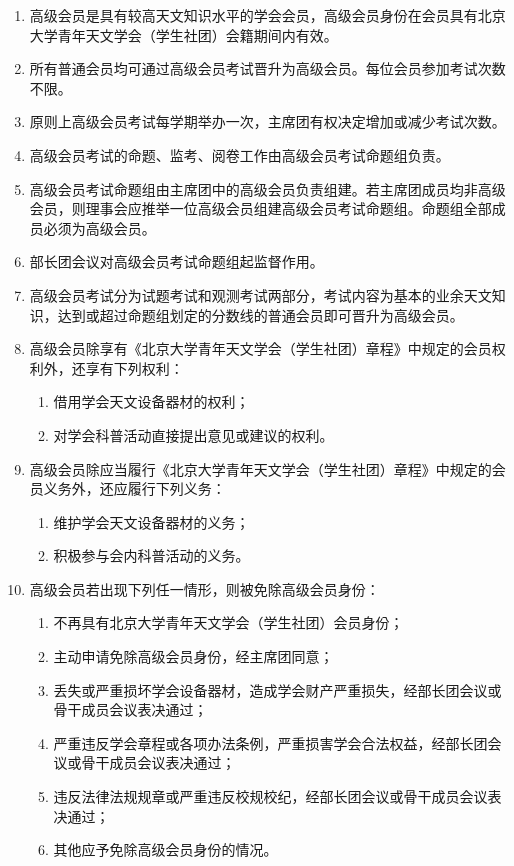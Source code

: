 \begin{enumerate}[resume]
    \item 高级会员是具有较高天文知识水平的学会会员，高级会员身份在会员具有北京大学青年天文学会（学生社团）会籍期间内有效。
    
    \item 所有普通会员均可通过高级会员考试晋升为高级会员。每位会员参加考试次数不限。
    
    \item 原则上高级会员考试每学期举办一次，主席团有权决定增加或减少考试次数。
    
    \item 高级会员考试的命题、监考、阅卷工作由高级会员考试命题组负责。
    
    \item 高级会员考试命题组由主席团中的高级会员负责组建。若主席团成员均非高级会员，则理事会应推举一位高级会员组建高级会员考试命题组。命题组全部成员必须为高级会员。
    
    \item 部长团会议对高级会员考试命题组起监督作用。
    
    \item 高级会员考试分为试题考试和观测考试两部分，考试内容为基本的业余天文知识，达到或超过命题组划定的分数线的普通会员即可晋升为高级会员。
    
    \item 高级会员除享有《北京大学青年天文学会（学生社团）章程》中规定的会员权利外，还享有下列权利：
    \begin{enumerate}
        \item 借用学会天文设备器材的权利；
        \item 对学会科普活动直接提出意见或建议的权利。
    \end{enumerate}

    \item 高级会员除应当履行《北京大学青年天文学会（学生社团）章程》中规定的会员义务外，还应履行下列义务：
    \begin{enumerate}
        \item 维护学会天文设备器材的义务；
        \item 积极参与会内科普活动的义务。
    \end{enumerate}

    \item 高级会员若出现下列任一情形，则被免除高级会员身份：
    \begin{enumerate}
        \item 不再具有北京大学青年天文学会（学生社团）会员身份；
        \item 主动申请免除高级会员身份，经主席团同意；
        \item 丢失或严重损坏学会设备器材，造成学会财产严重损失，经部长团会议或骨干成员会议表决通过；
        \item 严重违反学会章程或各项办法条例，严重损害学会合法权益，经部长团会议或骨干成员会议表决通过；
        \item 违反法律法规规章或严重违反校规校纪，经部长团会议或骨干成员会议表决通过；
        \item 其他应予免除高级会员身份的情况。
    \end{enumerate}
\end{enumerate}

